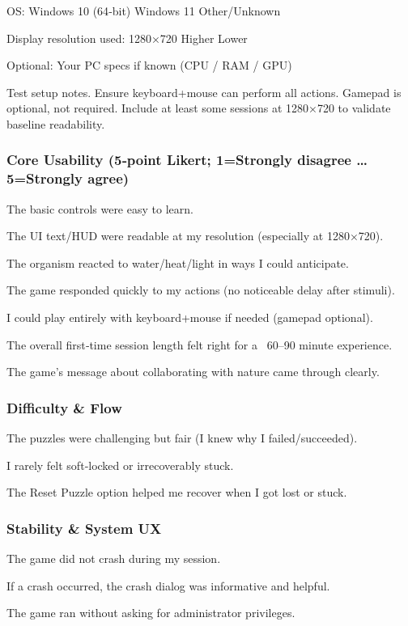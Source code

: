 \documentclass[12pt, titlepage]{article}
\begin{document}
OS:  Windows 10 (64‑bit)  Windows 11  Other/Unknown

Display resolution used:  1280×720  Higher  Lower

Optional: Your PC specs if known (CPU / RAM / GPU)

Test setup notes. Ensure keyboard+mouse can perform all actions. Gamepad is optional, not required. Include at least some sessions at 1280×720 to validate baseline readability.

\subsubsection{Core Usability (5‑point Likert; 1=Strongly disagree … 5=Strongly agree)}

The basic controls were easy to learn.

The UI text/HUD were readable at my resolution (especially at 1280×720).

The organism reacted to water/heat/light in ways I could anticipate.

The game responded quickly to my actions (no noticeable delay after stimuli).

I could play entirely with keyboard+mouse if needed (gamepad optional).

The overall first‑time session length felt right for a ~60–90 minute experience.

The game’s message about collaborating with nature came through clearly.

\subsubsection{Difficulty & Flow}

The puzzles were challenging but fair (I knew why I failed/succeeded).

I rarely felt soft‑locked or irrecoverably stuck.

The Reset Puzzle option helped me recover when I got lost or stuck.

\subsubsection{Stability & System UX}

The game did not crash during my session.

If a crash occurred, the crash dialog was informative and helpful.

The game ran without asking for administrator privileges.
\end{document}
